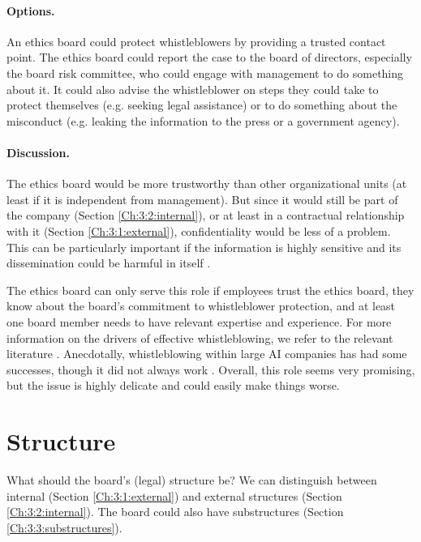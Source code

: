 \documentclass{article}
\begin{document}
\paragraph{Options.} An ethics board could protect whistleblowers by providing a trusted contact point. The ethics board could report the case to the board of directors, especially the board risk committee, who could engage with management to do something about it. It could also advise the whistleblower on steps they could take to protect themselves (e.g. seeking legal assistance) or to do something about the misconduct (e.g. leaking the information to the press or a government agency).

\paragraph{Discussion.} The ethics board would be more trustworthy than other organizational units (at least if it is independent from management). But since it would still be part of the company (Section \ref{Ch:3:2:internal}), or at least in a contractual relationship with it (Section \ref{Ch:3:1:external}), confidentiality would be less of a problem. This can be particularly important if the information is highly sensitive and its dissemination could be harmful in itself \cite{urbina2022dual, bostrom2011information, bostrom2019vulnerable}. 

The ethics board can only serve this role if employees trust the ethics board, they know about the board’s commitment to whistleblower protection, and at least one board member needs to have relevant expertise and experience. For more information on the drivers of effective whistleblowing, we refer to the relevant literature \cite{near1995effective, apaza2011makes}. Anecdotally, whistleblowing within large AI companies has had some successes, though it did not always work \cite{cihon2021corporate}. Overall, this role seems very promising, but the issue is highly delicate and could easily make things worse.

\section{Structure}\label{Ch:3:structure}

What should the board’s (legal) structure be? We can distinguish between internal (Section \ref{Ch:3:1:external}) and external structures (Section \ref{Ch:3:2:internal}). The board could also have substructures (Section \ref{Ch:3:3:substructures}).
\end{document}
